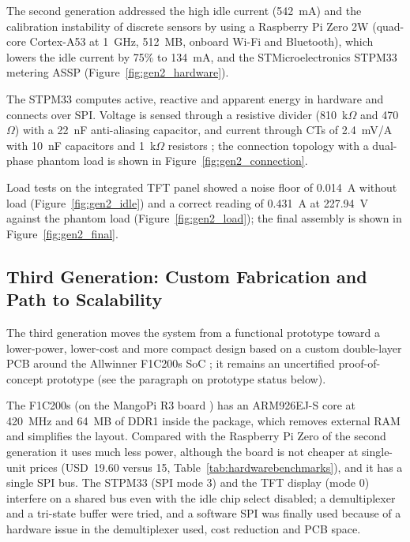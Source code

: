 \documentclass[fleqn,10pt]{wlscirep}
\begin{document}
The second generation addressed the high idle current (542~mA) and the calibration instability of discrete sensors by using a Raspberry Pi Zero 2W \cite{RPiZeroW_Datasheet} (quad-core Cortex-A53 at 1~GHz, 512~MB, onboard Wi-Fi and Bluetooth), which lowers the idle current by 75\% to 134~mA, and the STMicroelectronics STPM33 \cite{STPM33_Datasheet} metering ASSP (Figure~\ref{fig:gen2_hardware}).


The STPM33 computes active, reactive and apparent energy in hardware and connects over SPI. Voltage is sensed through a resistive divider (810~k$\Omega$ and 470~$\Omega$) with a 22~nF anti-aliasing capacitor, and current through CTs of 2.4~mV/A with 10~nF capacitors and 1~k$\Omega$ resistors \cite{EVALSTPM33_UserManual}; the connection topology with a dual-phase phantom load is shown in Figure~\ref{fig:gen2_connection}.


Load tests on the integrated TFT panel showed a noise floor of 0.014~A without load (Figure~\ref{fig:gen2_idle}) and a correct reading of 0.431~A at 227.94~V against the phantom load (Figure~\ref{fig:gen2_load}); the final assembly is shown in Figure~\ref{fig:gen2_final}.




\subsection{Third Generation: Custom Fabrication and Path to Scalability}
\label{subsec:gen3}

The third generation moves the system from a functional prototype toward a lower-power, lower-cost and more compact design based on a custom double-layer PCB around the Allwinner F1C200s SoC \cite{f1c200s}; it remains an uncertified proof-of-concept prototype (see the paragraph on prototype status below).

The F1C200s (on the MangoPi R3 board \cite{mangopi}) has an ARM926EJ-S core at 420~MHz and 64~MB of DDR1 inside the package, which removes external RAM and simplifies the layout. Compared with the Raspberry Pi Zero of the second generation it uses much less power, although the board is not cheaper at single-unit prices (USD~19.60 versus 15, Table~\ref{tab:hardwarebenchmarks}), and it has a single SPI bus. The STPM33 (SPI mode 3) and the TFT display (mode 0) interfere on a shared bus even with the idle chip select disabled; a demultiplexer and a tri-state buffer were tried, and a software SPI was finally used because of a hardware issue in the demultiplexer used, cost reduction and PCB space.
\end{document}
